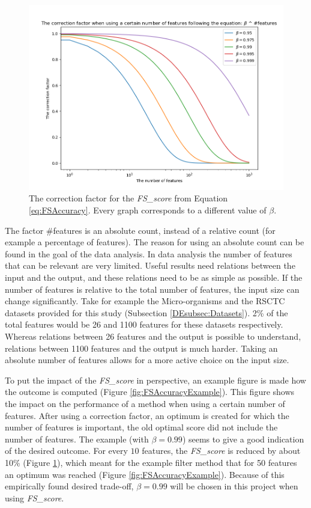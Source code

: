 \documentclass[10pt,a4paper]{report}
\begin{document}
	\begin{figure}[H]
		\includegraphics[width=1\textwidth]{FS_accuracy_alpha.png}
		\caption{The correction factor for the \textit{FS\_score} from Equation \ref{eq:FSAccuracy}. Every graph corresponds to a different value of $\beta$.}
		\label{fig:FSAccuracyPlot}
	\end{figure}
	
	The factor \mbox{\#features} is an absolute count, instead of a relative count (for example a percentage of features). The reason for using an absolute count can be found in the goal of the data analysis. In data analysis the number of features that can be relevant are very limited. Useful results need relations between the input and the output, and these relations need to be as simple as possible. If the number of features is relative to the total number of features, the input size can change significantly. Take for example the Micro-organisms and the RSCTC datasets provided for this study (Subsection \ref{DEsubsec:Datasets}). 2\% of the total features would be 26 and 1100 features for these datasets respectively. Whereas relations between 26 features and the output is possible to understand, relations between 1100 features and the output is much harder. Taking an absolute number of features allows for a more active choice on the input size.
	
	To put the impact of the \textit{FS\_score} in perspective, an example figure is made how the outcome is computed (Figure \ref{fig:FSAccuracyExample}). This figure shows the impact on the performance of a method when using a certain number of features. After using a correction factor, an optimum is created for which the number of features is important, the old optimal score did not include the number of features. The example (with $\beta = 0.99$) seems to give a good indication of the desired outcome. For every $10$ features, the \textit{FS\_score} is reduced by about 10\% (Figure \ref{fig:FSAccuracyPlot}), which meant for the example filter method that for 50 features an optimum was reached (Figure \ref{fig:FSAccuracyExample}). Because of this empirically found desired trade-off, $\beta = 0.99$ will be chosen in this project when using \textit{FS\_score}. 
	
\end{document}
